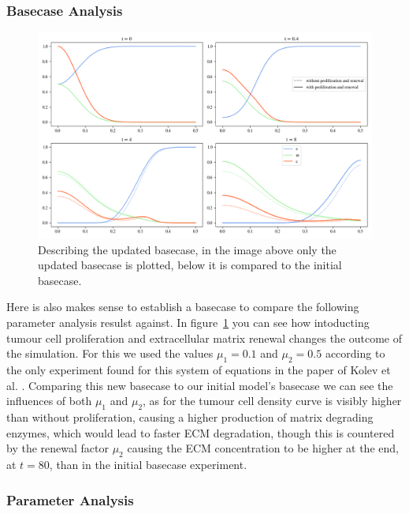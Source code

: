\subsubsection*{Basecase Analysis}

\begin{figure}[h]
    \centering
    \includegraphics[width=\textwidth]{resources/images/basecase_comparison.png}
    \caption{Describing the updated basecase, in the image above only the updated basecase is plotted, below it is compared to the initial basecase.}
    \label{fig:2D_basecase_comparison}
\end{figure}

Here is also makes sense to establish a basecase to compare the following parameter analysis resulst against. In figure~\ref{fig:2D_basecase_comparison} you can see how intoducting tumour cell proliferation and extracellular matrix renewal changes the outcome of the simulation. For this we used the values $\mu_1= 0.1$ and $\mu_2=0.5$ according to the only experiment found for this system of equations in the paper of Kolev et al. \cite{Kolev2010}.\newline
Comparing this new basecase to our initial model's basecase we can see the influences of both $\mu_1$ and $\mu_2$, as for the tumour cell density curve is visibly higher than without proliferation, causing a higher production of matrix degrading enzymes, which would lead to faster ECM degradation, though this is countered by the renewal factor $\mu_2$ causing the ECM concentration to be higher at the end, at $t=80$, than in the initial basecase experiment.




\subsubsection{Parameter Analysis}


